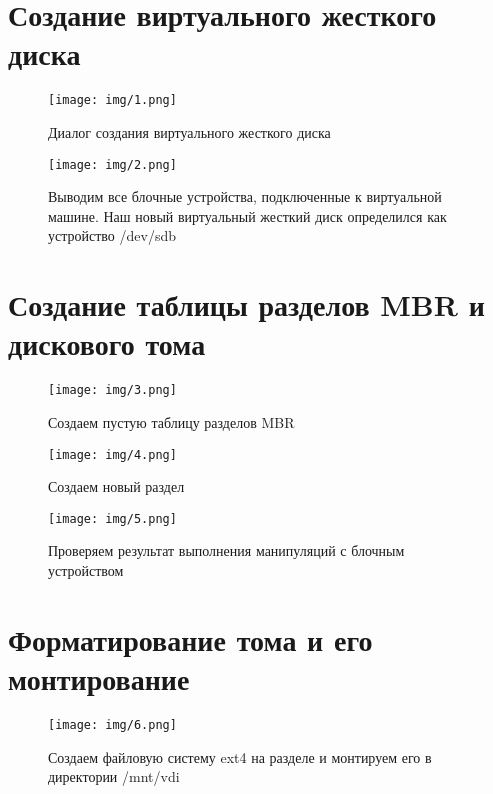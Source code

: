\documentclass{gost}
\begin{document}
	\gostTitlePage

	\section{Создание виртуального жесткого диска}
		\begin{figure}[H]
			\texttt{[image: img/1.png]}
			\caption{Диалог создания виртуального жесткого диска}
		\end{figure}

		\begin{figure}[H]
			\texttt{[image: img/2.png]}
			\caption{Выводим все блочные устройства, подключенные к виртуальной
			машине. Наш новый виртуальный жесткий диск определился как устройство
			/dev/sdb}
		\end{figure}

	\section{Создание таблицы разделов MBR и дискового тома}
		\begin{figure}[H]
			\texttt{[image: img/3.png]}
			\caption{Создаем пустую таблицу разделов MBR}
		\end{figure}

		\begin{figure}[H]
			\texttt{[image: img/4.png]}
			\caption{Создаем новый раздел}
		\end{figure}

		\begin{figure}[H]
			\texttt{[image: img/5.png]}
			\caption{Проверяем результат выполнения манипуляций с блочным устройством}
		\end{figure}

	\section{Форматирование тома и его монтирование}
		\begin{figure}[H]
			\texttt{[image: img/6.png]}
			\caption{Создаем файловую систему ext4 на разделе и монтируем его в
			директории /mnt/vdi}
		\end{figure}
\end{document}
